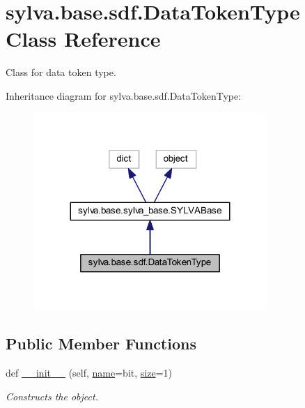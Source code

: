 \hypertarget{classsylva_1_1base_1_1sdf_1_1_data_token_type}{}\section{sylva.\+base.\+sdf.\+Data\+Token\+Type Class Reference}
\label{classsylva_1_1base_1_1sdf_1_1_data_token_type}


Class for data token type.  




Inheritance diagram for sylva.\+base.\+sdf.\+Data\+Token\+Type\+:\nopagebreak
\begin{figure}[H]
\begin{center}
\leavevmode
\includegraphics[width=251pt]{classsylva_1_1base_1_1sdf_1_1_data_token_type__inherit__graph}
\end{center}
\end{figure}
\subsection*{Public Member Functions}
\begin{DoxyCompactItemize}
\item 
def \hyperlink{classsylva_1_1base_1_1sdf_1_1_data_token_type_a66ffd0baf50eee248190857d5d4793ec}{\+\_\+\+\_\+init\+\_\+\+\_\+} (self, \hyperlink{classsylva_1_1base_1_1sdf_1_1_data_token_type_a64214bba14fcba747fd608caef007924}{name}=\textquotesingle{}bit\textquotesingle{}, \hyperlink{classsylva_1_1base_1_1sdf_1_1_data_token_type_abf397c07db4eced64bf773de13fcbbf0}{size}=1)
\begin{DoxyCompactList}\small\item\em Constructs the object. \end{DoxyCompactList}\end{DoxyCompactItemize}
